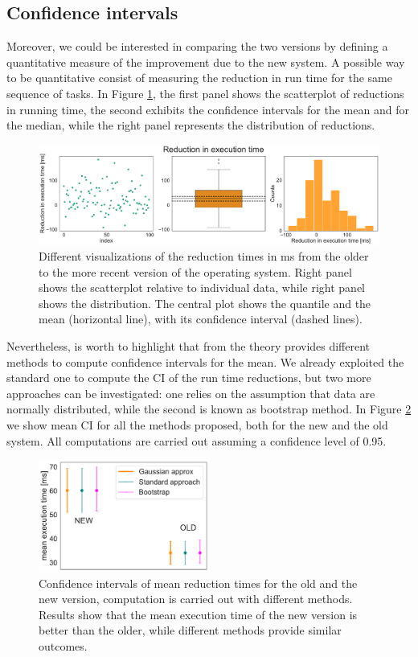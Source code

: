\documentclass[twoside,onecolumn]{article}
\theoremstyle{definition}
\begin{document}
\subsection{Confidence intervals}
Moreover, we could be interested in comparing the two versions by defining a quantitative measure of the improvement due to the new system. A possible way to be quantitative  consist of measuring the reduction in run time for the same sequence of tasks. In Figure \ref{fig:reduction}, the first panel shows the scatterplot of reductions in running time, the second exhibits the confidence intervals for the mean and for the median, while the right panel represents the distribution of reductions.

\begin{figure} \centering
\includegraphics[width=1\textwidth]{../figs/extimes_reduction.pdf}
\caption{Different visualizations of the reduction times in ms from the older to the more recent version of the operating system. Right panel shows the scatterplot relative to individual data, while right panel shows the distribution. The central plot shows the quantile and the mean (horizontal line), with its confidence interval (dashed lines).}\label{fig:reduction}
\end{figure}

Nevertheless, is worth to highlight that from the theory provides different methods to compute confidence intervals for the mean. We already exploited the standard one to compute the CI of the run time reductions, but two more approaches can be investigated: one relies on the assumption that data are normally distributed, while the second is known as bootstrap method. In Figure \ref{fig:ci_methods} we show mean CI for all the methods proposed, both for the new and the old system.
All computations are carried out assuming a confidence level of 0.95.

\begin{figure} \centering
\includegraphics[width=0.5\textwidth]{../figs/CI_methods_comparison.pdf}
\caption{Confidence intervals of mean reduction times for the old and the new version, computation is carried out with different methods. Results show that the mean execution time of the new version is better than the older, while different methods provide similar outcomes.}\label{fig:ci_methods}
\end{figure}
\end{document}
